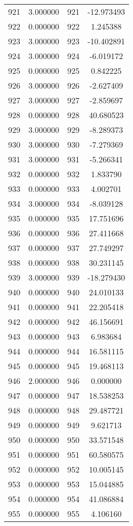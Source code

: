 \documentclass[12pt]{article}
\begin{document}
\begin{longtable}{@{}cccc@{}}
921 & 3.000000 & 921 & -12.973493 \\
922 & 0.000000 & 922 & 1.245388 \\
923 & 3.000000 & 923 & -10.402891 \\
924 & 3.000000 & 924 & -6.019172 \\
925 & 0.000000 & 925 & 0.842225 \\
926 & 3.000000 & 926 & -2.627409 \\
927 & 3.000000 & 927 & -2.859697 \\
928 & 0.000000 & 928 & 40.680523 \\
929 & 3.000000 & 929 & -8.289373 \\
930 & 3.000000 & 930 & -7.279369 \\
931 & 3.000000 & 931 & -5.266341 \\
932 & 0.000000 & 932 & 1.833790 \\
933 & 0.000000 & 933 & 4.002701 \\
934 & 3.000000 & 934 & -8.039128 \\
935 & 0.000000 & 935 & 17.751696 \\
936 & 0.000000 & 936 & 27.411668 \\
937 & 0.000000 & 937 & 27.749297 \\
938 & 0.000000 & 938 & 30.231145 \\
939 & 3.000000 & 939 & -18.279430 \\
940 & 0.000000 & 940 & 24.010133 \\
941 & 0.000000 & 941 & 22.205418 \\
942 & 0.000000 & 942 & 46.156691 \\
943 & 0.000000 & 943 & 6.983684 \\
944 & 0.000000 & 944 & 16.581115 \\
945 & 0.000000 & 945 & 19.468113 \\
946 & 2.000000 & 946 & 0.000000 \\
947 & 0.000000 & 947 & 18.538253 \\
948 & 0.000000 & 948 & 29.487721 \\
949 & 0.000000 & 949 & 9.621713 \\
950 & 0.000000 & 950 & 33.571548 \\
951 & 0.000000 & 951 & 60.580575 \\
952 & 0.000000 & 952 & 10.005145 \\
953 & 0.000000 & 953 & 15.044885 \\
954 & 0.000000 & 954 & 41.086884 \\
955 & 0.000000 & 955 & 4.106160 \\

\end{longtable}
\end{document}
